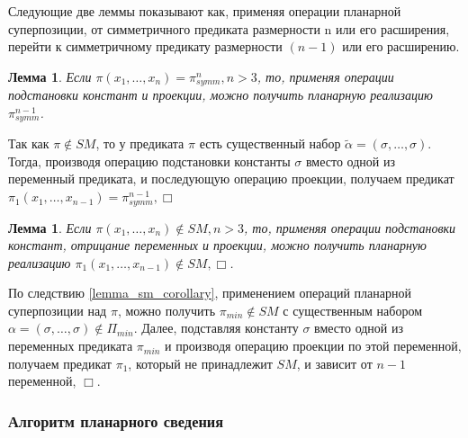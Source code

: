\documentclass[12pt]{article}
\newtheorem{lemma}[theorem]{Лемма}
\newenvironment{proof}[1][Доказательство]{\begin{trivlist}
\item[\hskip \labelsep {\bfseries #1}]}{\end{trivlist}}
\begin{document}
Следующие две леммы показывают как, применяя операции планарной суперпозиции, от симметричного предиката
размерности n или его расширения, перейти к симметричному предикату размерности $(n-1)$ или его расширению.

\begin{lemma}
\label{eq:svedenie1}
Если $\pi(x_1, \dots, x_n) = \pi_{symm}^n, n > 3$, то, 
применяя операции подстановки констант и проекции, можно получить планарную реализацию $\pi_{symm}^{n-1}$.
\end{lemma}

\begin{proof}
Так как 
$\pi \notin SM$, то у предиката $\pi$ есть существенный набор $\widetilde{\alpha} = (\sigma, \dots, \sigma)$.
Тогда, производя операцию подстановки константы $\sigma$ вместо одной из переменный предиката, и последующую 
операцию проекции, получаем предикат $\pi_1(x_1, \dots, x_{n-1}) = \pi_{symm}^{n-1}, \Box$
\end{proof}

\begin{lemma}
\label{eq:svedenie2}
Если $\pi(x_1, \dots, x_n) \notin SM, n > 3$, то, применяя операции подстановки констант, отрицание переменных и 
проекции, можно получить планарную реализацию $\pi_1(x_1, \dots, x_{n-1}) \notin SM, \Box$.
\end{lemma}

\begin{proof}
По следствию \ref{lemma_sm_corollary}, применением операций планарной суперпозиции над $\pi$, можно получить 
$\pi_{min} \notin SM$ с существенным набором $\alpha=(\sigma, \dots, \sigma) \notin \Pi_{min}$. 
Далее, подставляя константу $\sigma$ вместо одной из переменных предиката $\pi_{min}$ и производя операцию проекции по
этой переменной, получаем предикат $\pi_1$, который
не принадлежит $SM$, и зависит от $n-1$ переменной, $\Box$.
\end{proof}

\subsubsection{Алгоритм планарного сведения}
\end{document}
